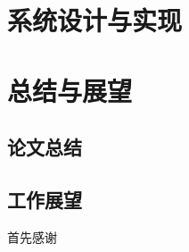 \documentclass[bachelor,winfonts]{jnuthesis}
\begin{document}
\chapter{系统设计与实现}


\chapter{总结与展望}
\section{论文总结}
\section{工作展望}


\begin{acknowledgement}
  首先感谢
\end{acknowledgement}


\nocite{*}

\end{document}
